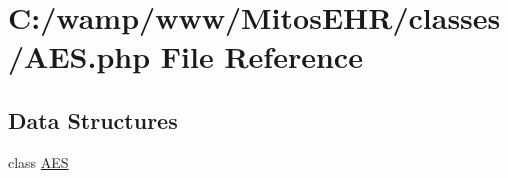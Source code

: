 \hypertarget{_a_e_s_8php}{\section{\-C\-:/wamp/www/\-Mitos\-E\-H\-R/classes/\-A\-E\-S.php \-File \-Reference}
\label{_a_e_s_8php}
}
\subsection*{\-Data \-Structures}
\begin{DoxyCompactItemize}
\item 
class \hyperlink{class_a_e_s}{\-A\-E\-S}
\end{DoxyCompactItemize}

